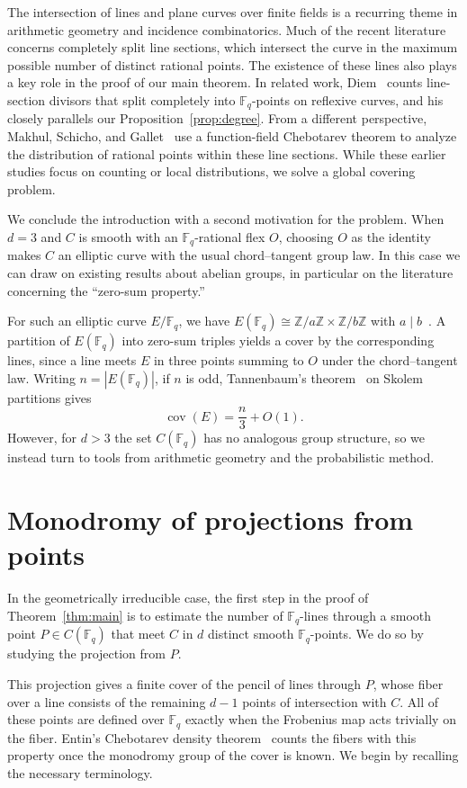 \documentclass[10pt,a4paper]{amsart}
\theoremstyle{definition}
\theoremstyle{remark}
\newcommand{\Fq}{\mathbb{F}_q}
\begin{document}
The intersection of lines and plane curves over finite fields is a recurring theme in arithmetic geometry and incidence combinatorics. Much of the recent literature concerns completely split line sections, which intersect the curve in the maximum possible number of distinct rational points. The existence of these lines also plays a key role in the proof of our main theorem. In related work, Diem~\cite{Die12} counts line-section divisors that split completely into $\Fq$-points on reflexive curves, and his \cite[Proposition~10]{Die12} closely parallels our Proposition~\ref{prop:degree}. From a different perspective, Makhul, Schicho, and Gallet~\cite{MSG20} use a function-field Chebotarev theorem to analyze the distribution of rational points within these line sections. While these earlier studies focus on counting or local distributions, we solve a global covering problem.

We conclude the introduction with a second motivation for the problem. When $d=3$ and $C$ is smooth with an $\Fq$-rational flex $O$, choosing $O$ as the identity makes $C$ an elliptic curve with the usual chord--tangent group law. In this case we can draw on existing results about abelian groups, in particular on the literature concerning the ``zero-sum property.''

For such an elliptic curve $E/\Fq$, we have
$E(\Fq)\cong\mathbb{Z}/a\mathbb{Z}\times\mathbb{Z}/b\mathbb{Z}$ with
$a\mid b$~\cite[Theorem~4.1, p.~97]{Was08}. A partition of $E(\Fq)$ into zero-sum triples yields a cover by the corresponding lines, since a line meets $E$ in three points summing to $O$ under the chord--tangent law. Writing $n=|E(\Fq)|$, if $n$ is odd, Tannenbaum's theorem~\cite{Tan81} on Skolem partitions gives
\[
\operatorname{cov}(E)=\frac{n}{3}+O(1).
\]
However, for $d>3$ the set $C(\Fq)$ has no analogous group structure, so we instead turn to tools from arithmetic geometry and the probabilistic method.

\section{Monodromy of projections from points}\label{sec:projection-monodromy}

In the geometrically irreducible case, the first step in the proof of Theorem~\ref{thm:main} is to estimate the number of $\Fq$-lines through a smooth point $P\in C(\Fq)$ that meet $C$ in $d$ distinct smooth $\Fq$-points. We do so by studying the projection from $P$.

This projection gives a finite cover of the pencil of lines through $P$, whose fiber over a line consists of the remaining $d-1$ points of intersection with $C$. All of these points are defined over $\Fq$ exactly when the Frobenius map acts trivially on the fiber. Entin's Chebotarev density theorem~\cite{Ent21} counts the fibers with this property once the monodromy group of the cover is known. We begin by recalling the necessary terminology.
\end{document}
